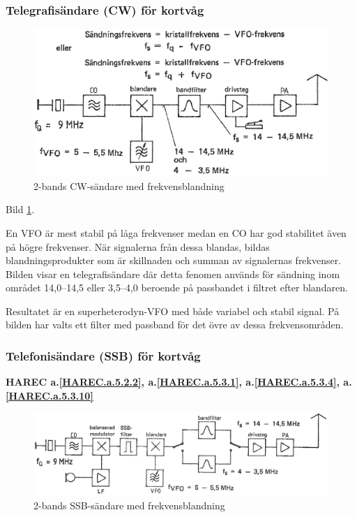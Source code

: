 \subsubsection{Telegrafisändare (CW) för kortvåg}

\begin{figure}
  \includegraphics[width=\textwidth]{images/cropped_pdfs/bild_2_5-04.pdf}
  \caption{2-bands CW-sändare med frekvensblandning}
  \label{fig:bildII5-4}
\end{figure}

Bild \ref{fig:bildII5-4}.

En VFO är mest stabil på låga frekvenser medan en CO har god
stabilitet även på högre frekvenser. När signalerna från dessa
blandas, bildas blandningsprodukter som är skillnaden och summan av
signalernas frekvenser. Bilden visar en telegrafisändare där detta
fenomen används för sändning inom området 14,0--14,5 eller 3,5--4,0
beroende på passbandet i filtret efter blandaren.

Resultatet är en superheterodyn-VFO med både variabel och stabil
signal. På bilden har valts ett filter med passband för det övre av
dessa frekvensområden.

\subsubsection{Telefonisändare (SSB) för kortvåg}
\textbf{
HAREC a.\ref{HAREC.a.5.2.2}\label{myHAREC.a.5.2.2},
 a.\ref{HAREC.a.5.3.1}\label{myHAREC.a.5.3.1},
 a.\ref{HAREC.a.5.3.4}\label{myHAREC.a.5.3.4},
 a.\ref{HAREC.a.5.3.10}\label{myHAREC.a.5.3.10}
}

\begin{figure}
  \includegraphics[width=\textwidth]{images/cropped_pdfs/bild_2_5-05.pdf}
  \caption{2-bands SSB-sändare med frekvensblandning}
  \label{fig:bildII5-5}
\end{figure}

